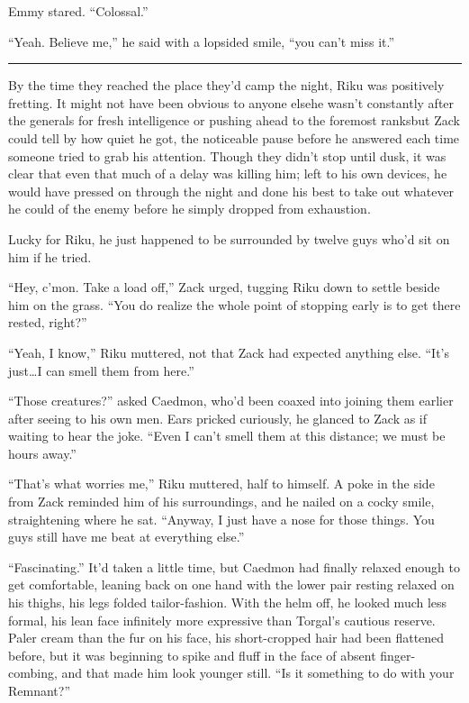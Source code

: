 Emmy stared. ``Colossal.''

``Yeah. Believe me,'' he said with a lopsided smile, ``you can't miss it.''

\fancybreak{\pfbreakdisplay}


By the time they reached the place they'd camp the night, Riku was positively fretting. It might not have been obvious to anyone else\textemdash he wasn't constantly after the generals for fresh intelligence or pushing ahead to the foremost ranks\textemdash but Zack could tell by how quiet he got, the noticeable pause before he answered each time someone tried to grab his attention. Though they didn't stop until dusk, it was clear that even that much of a delay was killing him; left to his own devices, he would have pressed on through the night and done his best to take out whatever he could of the enemy before he simply dropped from exhaustion.

Lucky for Riku, he just happened to be surrounded by twelve guys who'd sit on him if he tried.

``Hey, c'mon. Take a load off,'' Zack urged, tugging Riku down to settle beside him on the grass. ``You do realize the whole point of stopping early is to get there rested, right?''

``Yeah, I know,'' Riku muttered, not that Zack had expected anything else. ``It's just\ldots I can smell them from here.''

``Those creatures?'' asked Caedmon, who'd been coaxed into joining them earlier after seeing to his own men. Ears pricked curiously, he glanced to Zack as if waiting to hear the joke. ``Even I can't smell them at this distance; we must be hours away.''

``That's what worries me,'' Riku muttered, half to himself. A poke in the side from Zack reminded him of his surroundings, and he nailed on a cocky smile, straightening where he sat. ``Anyway, I just have a nose for those things. You guys still have me beat at everything else.''

``Fascinating.'' It'd taken a little time, but Caedmon had finally relaxed enough to get comfortable, leaning back on one hand with the lower pair resting relaxed on his thighs, his legs folded tailor-fashion. With the helm off, he looked much less formal, his lean face infinitely more expressive than Torgal's cautious reserve. Paler cream than the fur on his face, his short-cropped hair had been flattened before, but it was beginning to spike and fluff in the face of absent finger-combing, and that made him look younger still. ``Is it something to do with your Remnant?''

